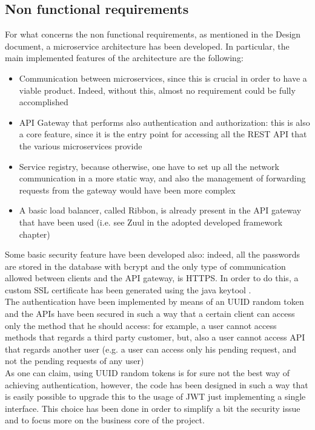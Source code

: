 \subsection{Non functional requirements}
For what concerns the non functional requirements, as mentioned in the Design document, a microservice architecture has been developed. 
In particular, the main implemented features of the architecture are the following: 
\begin{itemize}
\item Communication between microservices, since this is crucial in order to have a viable product. Indeed, without this, almost no
requirement could be fully accomplished
\item API Gateway that performs also authentication and authorization: this is also a core feature, since it is the entry point for accessing
all the REST API that the various microservices provide
\item Service registry, because otherwise, one have to set up all the network communication in a more static way, and also the management
of forwarding requests from the gateway would have been more complex 
\item A basic load balancer, called Ribbon, is already present in the API gateway that have been used (i.e. see Zuul in the adopted developed framework 
chapter)
\end{itemize}

\par Some basic security feature have been developed also: indeed, all the passwords are stored in the database with bcrypt and the only type
of communication allowed between clients and the API gateway, is HTTPS. In order to do this, a custom SSL certificate has been
generated using the java keytool \cite{httpstool}.
\\
The authentication have been implemented by means of an UUID random token and the APIs have been secured in such a way that a certain client
can access only the method that he should access: for example, a user cannot access methods that regards a third party customer, but, also
a user cannot access API that regards another user (e.g. a user can access only his pending request, and not the pending requests of any
user) \\
As one can claim, using UUID random tokens is for sure not the best way of achieving authentication, however, the code has been designed
in such a way that is easily possible to upgrade this to the usage of JWT just implementing a single interface. This choice
has been done in order to simplify a bit the security issue and to focus more on the business core of the project. 

